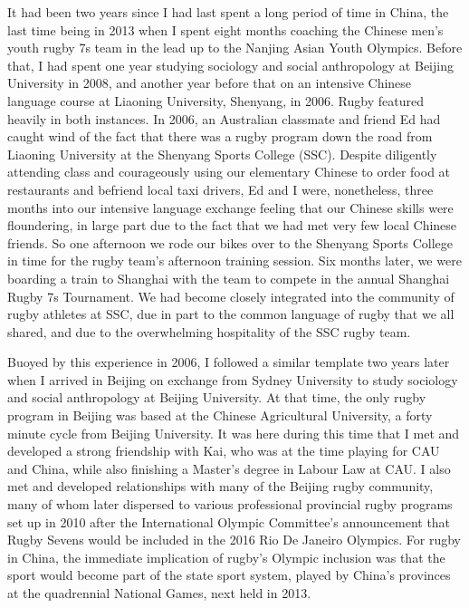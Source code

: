 It had been two years since I had last spent a long period of time in China, the last time being in 2013 when I spent eight months coaching the Chinese men's youth rugby 7s team in the lead up to the Nanjing Asian Youth Olympics.  Before that, I had spent one year studying sociology and social anthropology at Beijing University in 2008, and another year before that on an intensive Chinese language course at Liaoning University, Shenyang, in 2006.  Rugby featured heavily in both instances.  In 2006, an Australian classmate and friend Ed had caught wind of the fact that there was a rugby program down the road from Liaoning University at the Shenyang Sports College (SSC).  Despite diligently attending class and courageously using our elementary Chinese to order food at restaurants and befriend local taxi drivers, Ed and I were, nonetheless, three months into our intensive language exchange feeling that our Chinese skills were floundering, in large part due to the fact that we had met very few local Chinese friends.  So one afternoon we rode our bikes over to the Shenyang Sports College in time for the rugby team's afternoon training session.  Six months later, we were boarding a train to Shanghai with the team to compete in the annual Shanghai Rugby 7s Tournament.  We had become closely integrated into the community of rugby athletes at SSC, due in part to the common language of rugby that we all shared, and due to the overwhelming hospitality of the SSC rugby team.

Buoyed by this experience in 2006, I followed a similar template two years later when I arrived in Beijing on exchange from Sydney University to study sociology and social anthropology at Beijing University.  At that time, the only rugby program in Beijing was  based at the Chinese Agricultural University, a forty minute cycle from Beijing University. It was here during this time that I met and developed a strong friendship with Kai, who was at the time playing for CAU and China, while also finishing a Master's degree in Labour Law at CAU.  I also met and developed relationships with many of the Beijing rugby community, many of whom later dispersed to various professional provincial rugby programs set up in 2010 after the International Olympic Committee's announcement that Rugby Sevens would be included in the 2016 Rio De Janeiro Olympics.  For rugby in China, the immediate implication of rugby's Olympic inclusion was that the sport would become part of the state sport system, played by China's provinces at the quadrennial National Games, next held in 2013.

